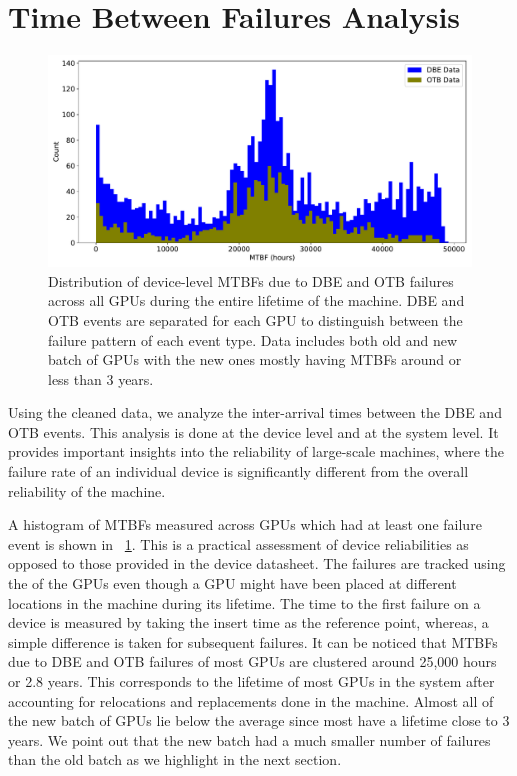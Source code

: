 \section{Time Between Failures Analysis}
\label{section:tbf}

\begin{figure}[bt]
  \begin{center}
    \includegraphics[trim={0 1em 0 1em},clip,width=\columnwidth]{figs/MTBF_GPUwise.pdf}
  \end{center}
  \caption{Distribution of device-level MTBFs due to DBE and OTB failures across all GPUs during the
entire lifetime of the machine. DBE and OTB events are separated for each GPU to distinguish between 
the failure pattern of each event type. Data includes both old and new batch of GPUs with the new ones 
mostly having MTBFs around or less than 3 years.}
  \label{fig:Device_MTBFs}
\end{figure}

Using the cleaned data, we analyze the inter-arrival times between the DBE and OTB events. 
This analysis is done at the device level and at the system level. 
It provides important insights into the reliability of large-scale machines, where the 
failure rate of an individual device is significantly different from the overall reliability
of the machine.  

A histogram of MTBFs measured across GPUs which had at least one failure event is shown 
in ~\ref{fig:Device_MTBFs}. This is a practical assessment of device reliabilities 
as opposed to those provided in the device datasheet. The failures are tracked using the
 of the GPUs even though a GPU might have been placed at different locations in the 
machine during its lifetime. The time to the first failure on a device is measured by taking
the insert time as the reference point, whereas, a simple difference is taken for subsequent
failures. It can be noticed that MTBFs due to DBE and OTB failures of most GPUs are clustered around 
25,000 hours or 2.8 years. This corresponds to the lifetime of most GPUs in the system after accounting 
for relocations and replacements done in the machine. Almost all of the new batch of GPUs lie below 
the average since most have a lifetime close to 3 years. We point out
that the new batch had a much smaller number of failures than
the old batch as we highlight in the next section.

